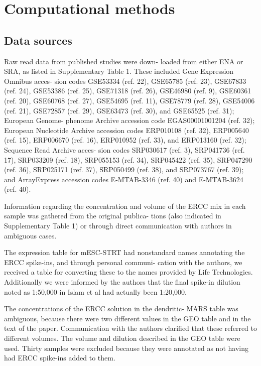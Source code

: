 \section{Computational methods}

\subsection{Data sources}

Raw read data from published studies were down- loaded from either ENA or SRA, as listed in Supplementary Table 1. These included Gene Expression Omnibus acces- sion codes GSE53334 (ref. 22), GSE65785 (ref. 23), GSE67833 (ref. 24), GSE53386 (ref. 25), GSE71318 (ref. 26), GSE46980 (ref. 9), GSE60361 (ref. 20), GSE60768 (ref. 27), GSE54695 (ref. 11), GSE78779 (ref. 28), GSE54006 (ref. 21), GSE72857 (ref. 29), GSE63473 (ref. 30), and GSE65525 (ref. 31); European Genome- phenome Archive accession code EGAS00001001204 (ref. 32); European Nucleotide Archive accession codes ERP010108 (ref. 32), ERP005640 (ref. 15), ERP006670 (ref. 16), ERP010952 (ref. 33), and ERP013160 (ref. 32); Sequence Read Archive acces- sion codes SRP030617 (ref. 3), SRP041736 (ref. 17), SRP033209 (ref. 18), SRP055153 (ref. 34), SRP045422 (ref. 35), SRP047290 (ref. 36), SRP025171 (ref. 37), SRP050499 (ref. 38), and SRP073767 (ref. 39); and ArrayExpress accession codes E-MTAB-3346 (ref. 40) and E-MTAB-3624 (ref. 40).

Information regarding the concentration and volume of the ERCC mix in each sample was gathered from the original publica- tions (also indicated in Supplementary Table 1) or through direct communication with authors in ambiguous cases.

The expression table for mESC-STRT had nonstandard names annotating the ERCC spike-ins, and through personal communi- cation with the authors, we received a table for converting these to the names provided by Life Technologies. Additionally we were informed by the authors that the final spike-in dilution noted as 1:50,000 in Islam et al \cite{Islam2014-dx} had actually been 1:20,000.

The concentrations of the ERCC solution in the dendritic- MARS table was ambiguous, because there were two different values in the GEO table and in the text of the paper. Communication with the authors clarified that these referred to different volumes. The volume and dilution described in the GEO table were used. Thirty samples were excluded because they were annotated as not having had ERCC spike-ins added to them.

